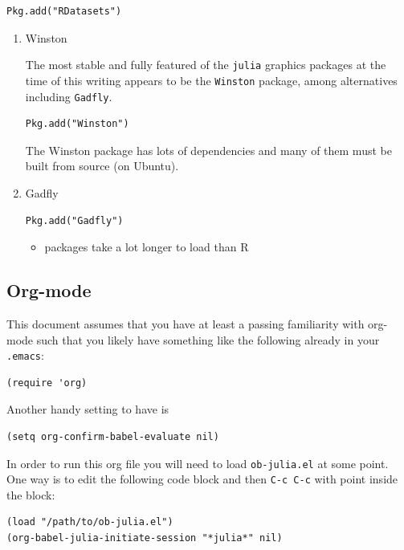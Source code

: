 \documentclass[11pt]{article}
\begin{document}
\begin{verbatim}
Pkg.add("RDatasets")
\end{verbatim}


\begin{enumerate}
\item Winston
\label{sec-1-2-1}

The most stable and fully featured of the \texttt{julia} graphics packages at the time of this writing appears to be the \texttt{Winston} package, among alternatives including \texttt{Gadfly}.

\begin{verbatim}
Pkg.add("Winston")
\end{verbatim}

The Winston package has lots of dependencies and many of them must be built from source (on Ubuntu).
\item Gadfly
\label{sec-1-2-2}

\begin{verbatim}
Pkg.add("Gadfly")
\end{verbatim}

\begin{itemize}
\item packages take a lot longer to load than R
\end{itemize}
\end{enumerate}
\subsection[Org-mode]{Org-mode}
\label{sec-1-3}

This document assumes that you have at least a passing familiarity with org-mode such that you likely have something like the following already in your \texttt{.emacs}:

\begin{verbatim}
(require 'org)
\end{verbatim}

Another handy setting to have is

\begin{verbatim}
(setq org-confirm-babel-evaluate nil)
\end{verbatim}

In order to run this org file you will need to load \texttt{ob-julia.el} at some point. One way is to edit the following code block and then \texttt{C-c C-c} with point inside the block:

\begin{verbatim}
(load "/path/to/ob-julia.el")
(org-babel-julia-initiate-session "*julia*" nil)
\end{verbatim}
\end{document}
